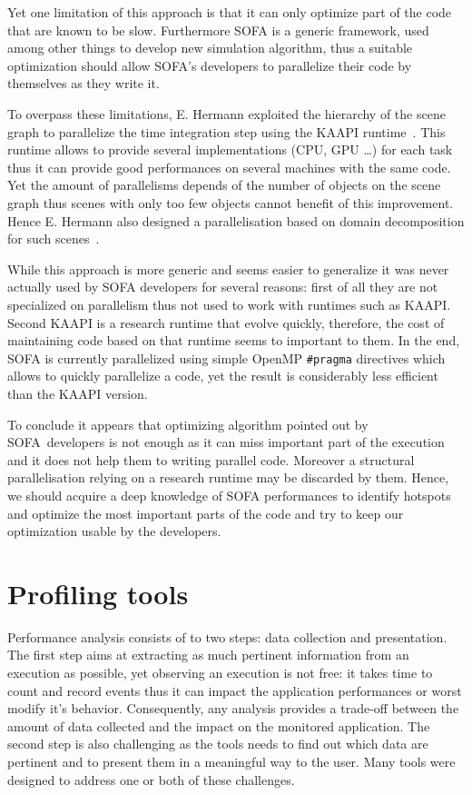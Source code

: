 Yet one limitation of this approach is that it can only optimize part of the code that are known to be slow.
Furthermore \gls{SOFA} is a generic framework, used among other things to develop new simulation algorithm, thus a suitable optimization should allow \gls{SOFA}'s developers to parallelize their code by themselves as they write it.

To overpass these limitations, E. Hermann exploited the hierarchy of the scene graph to parallelize the time integration step using the \gls{KAAPI} runtime~\cite{Gautier07KAAPI}.
This runtime allows to provide several implementations (\gls{CPU}, \gls{GPU} \ldots) for each task thus it can provide good performances on several machines with the same code.
Yet the amount of parallelisms depends of the number of objects on the scene graph thus scenes with only too few objects cannot benefit of this improvement.
Hence E. Hermann also designed a parallelisation based on domain decomposition for such scenes~\cite{Hermann09Interactive}.

While this approach is more generic and seems easier to generalize it was never actually used by \gls{SOFA} developers for several reasons: first of all they are not specialized on parallelism thus not used to work with runtimes such as \gls{KAAPI}.
Second \gls{KAAPI} is a research runtime that evolve quickly, therefore, the cost of maintaining code based on that runtime seems to important to them.
In the end, \gls{SOFA} is currently parallelized using simple \gls{OpenMP} \texttt{\#pragma} directives which allows to quickly parallelize a code, yet the result is considerably less efficient than the \gls{KAAPI} version.

To conclude it appears that optimizing algorithm pointed out by \gls{SOFA} developers is not enough as it can miss important part of the execution and it does not help them to writing parallel code.
Moreover a structural parallelisation relying on a research runtime may be discarded by them.
Hence, we should acquire a deep knowledge of \gls{SOFA} performances to identify hotspots and optimize the most important parts of the code and try to keep our optimization usable by the developers.

\section{Profiling tools}
\label{sec:prof-tools}

Performance analysis consists of to two steps: data collection and presentation.
The first step aims at extracting as much pertinent information from an execution as possible, yet observing an execution is not free: it takes time to count and record events thus it can impact the application performances or worst modify it's behavior.
Consequently, any analysis provides a trade-off between the amount of data collected and the impact on the monitored application.
The second step is also challenging as the tools needs to find out which data are pertinent and to present them in a meaningful way to the user.
Many tools were designed to address one or both of these challenges.


